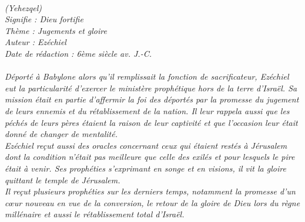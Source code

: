 \BFont
\noindent\hrulefill
{\footnotesize
\textit{
\bigskip
{\centering{}
\\(Yehezqel)
\\Signifie : Dieu fortifie
\\Thème : Jugements et gloire
\\Auteur : Ezéchiel
\\Date de rédaction : 6ème siècle av. J.-C.\\}
}
\textit{
\\Déporté à Babylone alors qu’il remplissait la fonction de sacrificateur, Ezéchiel eut la particularité d’exercer le ministère prophétique hors de la terre d’Israël. Sa mission était en partie d’affermir la foi des déportés par la promesse du jugement de leurs ennemis et du rétablissement de la nation. Il leur rappela aussi que les péchés de leurs pères étaient la raison de leur captivité et que l’occasion leur était donné de changer de mentalité.
\\Ezéchiel reçut aussi des oracles concernant ceux qui étaient restés à Jérusalem dont la condition n’était pas meilleure que celle des exilés et pour lesquels le pire était à venir.
Ses prophéties s’exprimant en songe et en visions, il vit la gloire quittant le temple de Jérusalem.
\\Il reçut plusieurs prophéties sur les derniers temps, notamment la promesse d’un cœur nouveau en vue de la conversion, le retour de la gloire de Dieu lors du règne millénaire et aussi le rétablissement total d’Israël.\bigskip
}
}
\par\nobreak\noindent\hrulefill
